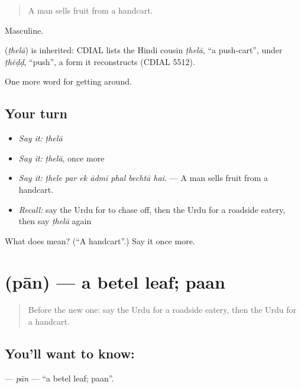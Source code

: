 \begin{quote}
A man sells fruit from a handcart.
\end{quote}

Masculine.

\begin{cousinweb}
\textbf{} (\emph{ṭhelā}) is inherited: CDIAL lists the Hindi cousin \emph{ṭhelā}, \textquotedblleft{}a push-cart\textquotedblright{}, under \emph{ṭhēḍḍ}, \textquotedblleft{}push\textquotedblright{}, a form it reconstructs (CDIAL 5512).
\end{cousinweb}

\begin{grammarlens}[title={What you've built}]
One more word for getting around.
\end{grammarlens}

\subsection*{Your turn}
\begin{itemize}
\raggedright
  \item \emph{Say it:} \emph{ṭhelā}
  \item \emph{Say it:} \emph{ṭhelā}, once more
  \item \emph{Say it:} \emph{ṭhele par ek ādmī phal bechtā hai.} — A man sells fruit from a handcart.
  \item \emph{Recall:} say the Urdu for to chase off, then the Urdu for a roadside eatery, then say \emph{ṭhelā} again
\end{itemize}

\begin{tcolorbox}[breakable,colback=teal!4,colframe=teal!35!black,title={Before you move on}]
What does  mean? (\textquotedblleft{}A handcart\textquotedblright{}.) Say it once more.
\end{tcolorbox}
\section[\texorpdfstring{\ur{پان} (pān)}{پان (pān)}]{ (pān) — a betel leaf; paan}

\label{lesson:UR-C415-pan}



\begin{quote}
Before the new one: say the Urdu for a roadside eatery, then the Urdu for a handcart.
\end{quote}

\subsection*{You'll want to know: }
\textbf{} — \emph{pān} — \textquotedblleft{}a betel leaf; paan\textquotedblright{}.

